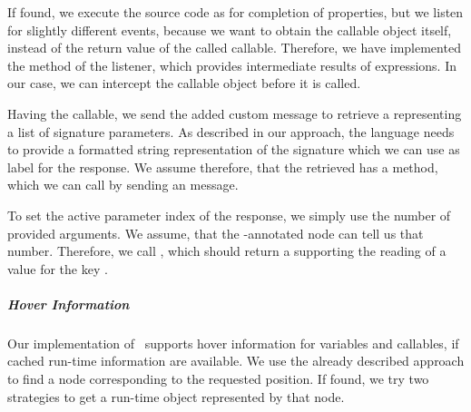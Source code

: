     If found, we execute the source code as for completion of properties, but we listen for slightly different events, because we want to obtain the callable object itself, instead of the return value of the called callable. Therefore, we have implemented the  method of the listener, which provides intermediate results of expressions. In our case, we can intercept the callable object before it is  called.
    
    Having the callable, we send the added custom message  to retrieve a  representing a list of signature parameters. As described in our approach, the language needs to provide a formatted string representation of the signature which we can use as label for the response. We assume therefore, that the retrieved  has a  method, which we can call by sending an  message.

    To set the active parameter index of the response, we simply use the number of provided arguments. We assume, that the -annotated node can tell us that number. Therefore, we call , which should return a  supporting the reading of a value for the key .



    \subparagraph{Hover Information}
    Our implementation of \graallsp~supports hover information for variables and callables, if cached run-time information are available. We use the already described approach to find a node corresponding to the requested position. If found, we try two strategies to get a run-time object represented by that node.
    
